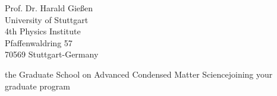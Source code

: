 \documentclass{letter}
\begin{document}
\begin{letter}{Prof. Dr. Harald Gießen \\
University of Stuttgart\\
4th Physics Institute\\
Pfaffenwaldring 57\\
70569 Stuttgart-Germany}

\begin{content}{the Graduate School on Advanced Condensed Matter Science}{joining your graduate program}
\teaching

\phdmot

\end{content}

\end{letter}
\end{document}
